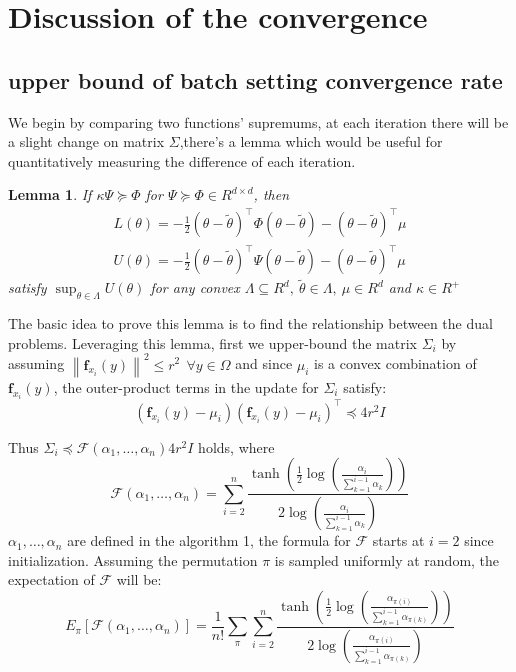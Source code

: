 \documentclass{article}
\newtheorem{lemma}{Lemma}
\begin{document}
\section{Discussion of the convergence}

\subsection{upper bound of batch setting convergence rate}

We begin by comparing two functions' supremums, at each iteration there will be a slight change on matrix $\Sigma$,there's a lemma which would be useful
for quantitatively measuring the difference of each iteration.

\begin{lemma}
 If $\kappa \Psi \succeq \Phi$ for $\Psi \succeq \Phi \in R^{d \times d}$, then
\begin{equation}
  \begin{aligned}
  L(\theta ) = -\frac{1}{2}(\theta  - \tilde{\theta})^{\top} \Phi (\theta  - \tilde{\theta}) - (\theta  - \tilde{\theta})^{\top}\mu \\ \nonumber
  U(\theta) = -\frac{1}{2}(\theta  - \tilde{\theta})^{\top} \Psi (\theta  - \tilde{\theta}) - (\theta  - \tilde{\theta})^{\top}\mu 
 \end{aligned}
 \end{equation}
  satisfy $\sup_{\theta \in \Lambda} U(\theta)$ for any convex $\Lambda \subseteq R^d, \ \tilde{\theta} \in  \Lambda, \ \mu \in R^d$ and $\kappa \in R^+$ 
\label{dual}
\end{lemma}

The basic idea to prove this lemma is to find the relationship between the dual problems. Leveraging this lemma, first we upper-bound the matrix
$\Sigma_i$ by assuming $\left\lVert \textbf{f}_{x_i}(y) \right\lVert^2 \leq r^2 \ \ \forall y\in \Omega $ and since $\mu_i$ is a convex combination of $\textbf{f}_{x_i}(y)$,
the outer-product terms in the update for $\Sigma_i$ satisfy:
\begin{equation}
  (\textbf{f}_{x_i}(y) - \mu_i)(\textbf{f}_{x_i}(y) - \mu_i)^{\top} \preceq 4r^2 I \nonumber
\end{equation}

Thus $\Sigma_i \preceq \mathcal{F}(\alpha_1, \ldots, \alpha_n) 4r^2 I$ holds, where
\begin{equation}
  \mathcal{F}(\alpha_1, \ldots, \alpha_n) =\sum_{i=2}^{n} \frac{\tanh(\frac{1}{2} \log(\frac{\alpha_i}{\sum_{k=1}^{i-1} \alpha_k}))}{2 \log (\frac{\alpha_i}{\sum_{k=1}^{i-1} \alpha_k})} \nonumber
\end{equation}
$\alpha_1, \ldots, \alpha_n$ are defined in the algorithm 1, the formula for $\mathcal{F}$ starts at $i = 2$ since initialization. Assuming the permutation $\pi$ is sampled uniformly at random,
the expectation of $\mathcal{F}$ will be:
\begin{equation}
  E_{\pi}[\mathcal{F}(\alpha_1, \ldots, \alpha_n)] = \frac{1}{n!}\sum_{\pi}\sum_{i=2}^{n} \frac{\tanh(\frac{1}{2} \log(\frac{\alpha_{\pi(i)}}{\sum_{k=1}^{i-1} \alpha_{\pi(k)}}))}{2 \log (\frac{\alpha_{\pi(i)}}{\sum_{k=1}^{i-1} \alpha_{\pi(k)}})} \nonumber
\end{equation}
\end{document}
